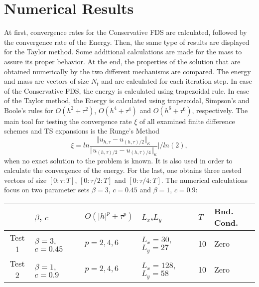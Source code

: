 \documentclass[%
 aip,
cp,  %
 amsmath,amssymb,%
 reprint,%
]{revtex4-2}
\begin{document}
\section{Numerical Results}

At first, convergence rates for the Conservative FDS are calculated, followed by the convergence rate of the Energy. Then, the same type of results are displayed for the Taylor method. Some additional calculations are made for the mass to assure its proper behavior. At the end, the properties of the solution that are obtained numerically by the two different mechanisms are compared. The energy and mass are vectors of size $N_t$ and are calculated for each iteration step. In case of the Conservative FDS, the energy is calculated using trapezoidal rule. In case of the Taylor method, the Energy is calculated using trapezoidal, Simpson's and Boole's rules for $O(h^{2} + \tau^2 )$, $O(h^{4} + \tau^4 )$ and $O(h^{6} + \tau^6 )$, respectively. The main tool for testing the convergence rate $\xi$ of all examined finite difference schemes and TS expansions is the Runge's Method
\begin{equation}\label{Runge}
\xi = ln  \frac{\Vert u_{h,\tau} - u_{(h,\tau)/2} \Vert_\kappa } {\Vert  u_{(h,\tau)/2} - u_{(h,\tau)/4} \Vert_\kappa  } | / ln(2),
\end{equation}
when no exact solution to the problem is known. It is also used in order to calculate the convergence of the energy. For the last, one obtains three nested vectors of size $[0:\tau:T]$, $[0:\tau/2:T]$ and $[0:\tau/4:T]$. The numerical calculations focus on two parameter sets $\beta = 3$, $c=0.45$ and $\beta = 1$, $c=0.9$:

\begin{table}[ht]
\centering
\small
		\begin{tabular}{||c|l|l|l|l|l||}
			\hline
			\hline
                                            &    $\beta$, $c$                              & $O(|h|^p + \tau^p)$                                 & $L_x$,$L_y$                                & $T$      &  Bnd. Cond.   \\

   			\hline 
					\hline 
           Test 1                        &      $\beta = 3$, $c=0.45$           &      $p=2, 4, 6$                              & $L_x = 30$,$L_y=27$                &                10    &    Zero  \\
	   \hline
			\hline 
           Test 2                        &      $\beta = 1$, $c=0.9$             &      $p=2, 4, 6$                              & $L_x = 128$,$L_y=58$                &               10    &   Zero  \\
	   \hline
			\hline 
		\end{tabular}

\end{table}
\end{document}

